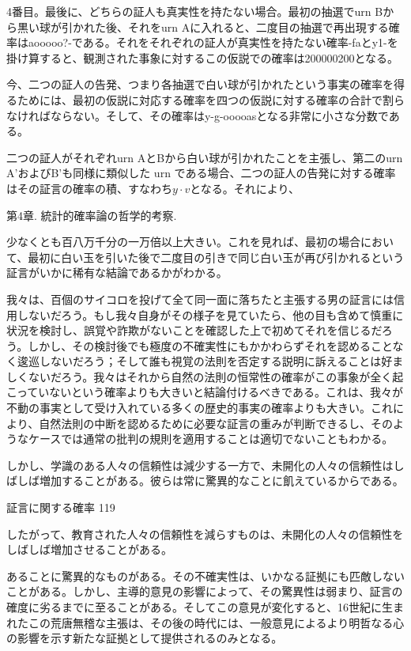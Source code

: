 \documentclass[a4paper,11pt,openany]{ltjsbook}
\begin{document}
4番目。最後に、どちらの証人も真実性を持たない場合。最初の抽選でurn Bから黒い球が引かれた後、それをurn Aに入れると、二度目の抽選で再出現する確率はaooooo?-である。それをそれぞれの証人が真実性を持たない確率-faとy1-を掛け算すると、観測された事象に対するこの仮説での確率は200000200となる。

今、二つの証人の告発、つまり各抽選で白い球が引かれたという事実の確率を得るためには、最初の仮説に対応する確率を四つの仮説に対する確率の合計で割らなければならない。そして、その確率はy-g-ooooasとなる非常に小さな分数である。

二つの証人がそれぞれurn AとBから白い球が引かれたことを主張し、第二のurn A'およびB'も同様に類似した urn である場合、二つの証人の告発に対する確率はその証言の確率の積、すなわち$y \cdot v$となる。それにより、

第4章. 統計的確率論の哲学的考察.

少なくとも百八万千分の一万倍以上大きい。これを見れば、最初の場合において、最初に白い玉を引いた後で二度目の引きで同じ白い玉が再び引かれるという証言がいかに稀有な結論であるかがわかる。

我々は、百個のサイコロを投げて全て同一面に落ちたと主張する男の証言には信用しないだろう。もし我々自身がその様子を見ていたら、他の目も含めて慎重に状況を検討し、誤覚や詐欺がないことを確認した上で初めてそれを信じるだろう。しかし、その検討後でも極度の不確実性にもかかわらずそれを認めることなく逡巡しないだろう；そして誰も視覚の法則を否定する説明に訴えることは好ましくないだろう。我々はそれから自然の法則の恒常性の確率がこの事象が全く起こっていないという確率よりも大きいと結論付けるべきである。これは、我々が不動の事実として受け入れている多くの歴史的事実の確率よりも大きい。これにより、自然法則の中断を認めるために必要な証言の重みが判断できるし、そのようなケースでは通常の批判の規則を適用することは適切でないこともわかる。

しかし、学識のある人々の信頼性は減少する一方で、未開化の人々の信頼性はしばしば増加することがある。彼らは常に驚異的なことに飢えているからである。

証言に関する確率 119

したがって、教育された人々の信頼性を減らすものは、未開化の人々の信頼性をしばしば増加させることがある。

あることに驚異的なものがある。その不確実性は、いかなる証拠にも匹敵しないことがある。しかし、主導的意見の影響によって、その驚異性は弱まり、証言の確度に劣るまでに至ることがある。そしてこの意見が変化すると、16世紀に生まれたこの荒唐無稽な主張は、その後の時代には、一般意見によるより明哲なる心の影響を示す新たな証拠として提供されるのみとなる。
\end{document}
